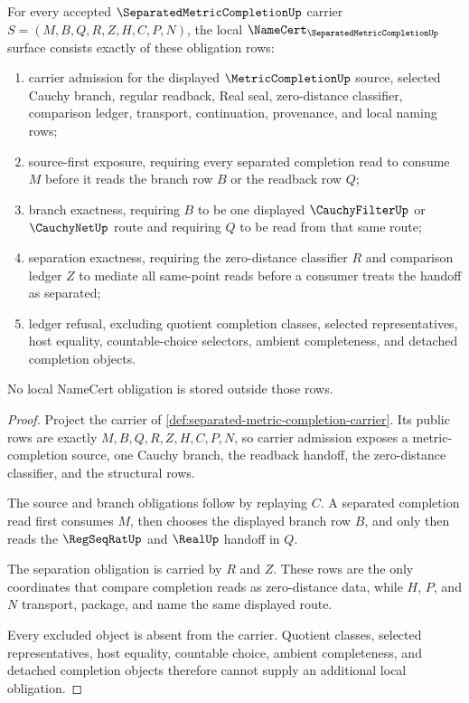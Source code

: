 \begin{theorem}
\label{thm:separated-metric-completion-namecert-obligations}
For every accepted $\SeparatedMetricCompletionUp$ carrier $S=(M,B,Q,R,Z,H,C,P,N)$, the local $\NameCert_{\SeparatedMetricCompletionUp}$ surface consists exactly of these obligation rows:
\begin{enumerate}
\item carrier admission for the displayed $\MetricCompletionUp$ source, selected Cauchy branch, regular readback, Real seal, zero-distance classifier, comparison ledger, transport, continuation, provenance, and local naming rows;
\item source-first exposure, requiring every separated completion read to consume $M$ before it reads the branch row $B$ or the readback row $Q$;
\item branch exactness, requiring $B$ to be one displayed $\CauchyFilterUp$ or $\CauchyNetUp$ route and requiring $Q$ to be read from that same route;
\item separation exactness, requiring the zero-distance classifier $R$ and comparison ledger $Z$ to mediate all same-point reads before a consumer treats the handoff as separated;
\item ledger refusal, excluding quotient completion classes, selected representatives, host equality, countable-choice selectors, ambient completeness, and detached completion objects.
\end{enumerate}
No local NameCert obligation is stored outside those rows.
\end{theorem}
\begin{proof}
Project the carrier of \autoref{def:separated-metric-completion-carrier}. Its public rows are exactly $M,B,Q,R,Z,H,C,P,N$, so carrier admission exposes a metric-completion source, one Cauchy branch, the readback handoff, the zero-distance classifier, and the structural rows.

The source and branch obligations follow by replaying $C$. A separated completion read first consumes $M$, then chooses the displayed branch row $B$, and only then reads the $\RegSeqRatUp$ and $\RealUp$ handoff in $Q$.

The separation obligation is carried by $R$ and $Z$. These rows are the only coordinates that compare completion reads as zero-distance data, while $H$, $P$, and $N$ transport, package, and name the same displayed route.

Every excluded object is absent from the carrier. Quotient classes, selected representatives, host equality, countable choice, ambient completeness, and detached completion objects therefore cannot supply an additional local obligation.
\end{proof}

